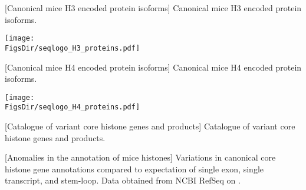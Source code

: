   \newpage
  \begin{center}
  [Canonical mice H3 encoded protein isoforms]%
                   {Canonical mice H3 encoded protein isoforms.}
  
  \texttt{[image: \\FigsDir/seqlogo\_H3\_proteins.pdf]}
  \end{center}

  \newpage
  \begin{center}
  [Canonical mice H4 encoded protein isoforms]%
                   {Canonical mice H4 encoded protein isoforms.}
  
  \texttt{[image: \\FigsDir/seqlogo\_H4\_proteins.pdf]}
  \end{center}

  \newpage
  \begin{center}
  [Catalogue of variant core histone genes and products]%
                   {Catalogue of variant core histone genes and products.}
  
  \end{center}

  \newpage
  \begin{center}
    [Anomalies in the annotation of mice histones]{
        Variations in canonical core histone gene annotations
        compared to expectation of single exon, single transcript,
        and stem-loop.
        Data obtained from NCBI RefSeq \citep{OLearyRefseq2016} on
        \SequencesDate{}.
    }
  \begin{itemize}
  
  \end{itemize}
  \end{center}
